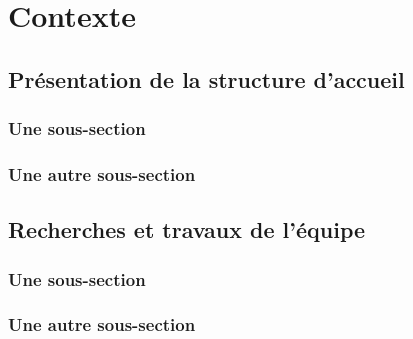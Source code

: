 \chapter{Contexte}

\lipsum %

\section{Présentation de la structure d'accueil}

\lipsum %

\subsection{Une sous-section}

\lipsum %

\subsection{Une autre sous-section}

\lipsum %


\section{Recherches et travaux de l'équipe}

\lipsum %

\subsection{Une sous-section}

\lipsum %

\subsection{Une autre sous-section}

\lipsum %